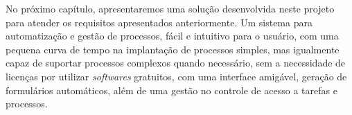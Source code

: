 No próximo capítulo, apresentaremos uma solução desenvolvida neste projeto para atender os requisitos apresentados anteriormente. Um sistema para automatização e gestão de processos, fácil e intuitivo para o usuário, com uma pequena curva de tempo na implantação de processos simples, mas igualmente capaz de suportar processos complexos quando necessário, sem a necessidade de licenças por utilizar \textit{softwares} gratuitos, com uma interface amigável, geração de formulários automáticos, além de uma gestão no controle de acesso a tarefas e processos.